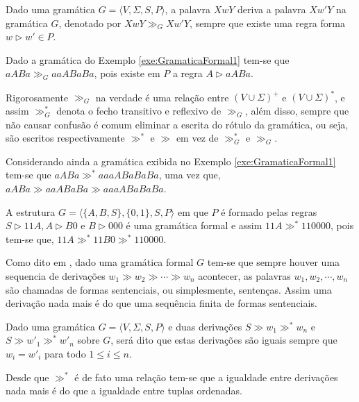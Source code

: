 \begin{definition}
	Dado uma gramática $G = \langle V, \Sigma, S, P \rangle$, a palavra $XwY$ deriva a palavra $Xw'Y$  na gramática $G$, denotado por $XwY \gg_G Xw'Y$, sempre que existe uma regra forma $w \rhd w' \in P$.
\end{definition}

\begin{example}
	Dado a gramática do Exemplo \ref{exe:GramaticaFormal1} tem-se que $aABa \gg_G aaABaBa$, pois existe em $P$ a regra $A \rhd aABa$.
\end{example}

Rigorosamente $\gg_G$ na verdade é uma relação entre $(V \cup \Sigma)^+$ e $(V \cup \Sigma)^*$, e assim $\gg_G^*$ denota o fecho transitivo e reflexivo de  $\gg_G$, além disso, sempre que não causar confusão é comum eliminar a escrita do rótulo da gramática, ou seja, são escritos respectivamente $\gg^*$ e $\gg$ em vez de $\gg_G^*$ e $\gg_G$.

\begin{example}
	Considerando ainda a gramática exibida no Exemplo \ref{exe:GramaticaFormal1} tem-se que $aABa \gg^* aaaABaBaBa$, uma vez que, $aABa \gg aaABaBa \gg aaaABaBaBa$.
\end{example}

\begin{example}
	A estrutura $G = \langle \{A, B, S\}, \{0,1\}, S, P \rangle$ em que $P$ é formado pelas regras $S \rhd 11A, A \rhd B0$ e $B \rhd 000$ é uma gramática formal e assim $11A \gg^* 110000$, pois tem-se que, $11A \gg^* 11B0 \gg^* 110000$.
\end{example}

Como dito em \cite{benjaLivro2010}, dado uma gramática formal $G$ tem-se que sempre houver uma sequencia de derivações $w_1 \gg w_2 \gg \cdots \gg w_n$ acontecer, as palavras $w_1, w_2, \cdots, w_n$ são chamadas de formas sentenciais, ou simplesmente, sentenças. Assim uma derivação nada mais é do que uma sequência finita de formas sentenciais.

\begin{definition}\label{def:IgualdadeDerivacaoGramatica}
	Dado uma gramática $G = \langle V, \Sigma, S, P \rangle$ e duas derivações $S \gg w_1 \gg^* w_n$ e $S \gg w'_1 \gg^* w'_n$ sobre $G$, será dito que estas derivações são iguais sempre que $w_i = w'_i$ para todo $1 \leq i \leq n$.
\end{definition}

Desde que $\gg^*$ é de fato uma relação tem-se que a igualdade entre derivações nada mais é do que a igualdade entre tuplas ordenadas.

